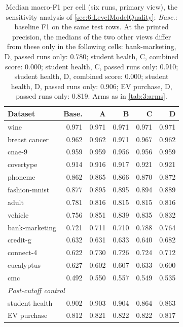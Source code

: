 \begin{table}[htbp]
  \centering
  \small
  \caption[Median F1 per cell]{Median macro-F1 per cell (six runs, primary view), the sensitivity analysis of \autoref{sec:6:LevelModelQuality}; \emph{Base.}: baseline F1 on the same test rows. At the printed precision, the medians of the two other views differ from these only in the following cells: bank-marketing, D, passed runs only: 0.780; student health, C, combined score: 0.000; student health, C, passed runs only: 0.910; student health, D, combined score: 0.000; student health, D, passed runs only: 0.906; EV purchase, D, passed runs only: 0.819. Arms as in \autoref{tab:3:arms}.}
  \label{tab:D:median}
  \begin{tabular}{lrrrrr}
    \toprule
    Dataset & Base. & A & B & C & D \\
    \midrule
    wine & 0.971 & 0.971 & 0.971 & 0.971 & 0.971 \\
    breast cancer & 0.962 & 0.962 & 0.971 & 0.967 & 0.962 \\
    cnae-9 & 0.959 & 0.959 & 0.956 & 0.956 & 0.959 \\
    covertype & 0.914 & 0.916 & 0.917 & 0.921 & 0.921 \\
    \addlinespace
    phoneme & 0.862 & 0.865 & 0.866 & 0.870 & 0.872 \\
    fashion-mnist & 0.877 & 0.895 & 0.895 & 0.894 & 0.889 \\
    adult & 0.781 & 0.816 & 0.815 & 0.815 & 0.816 \\
    vehicle & 0.756 & 0.851 & 0.839 & 0.835 & 0.832 \\
    \addlinespace
    bank-marketing & 0.721 & 0.711 & 0.710 & 0.788 & 0.764 \\
    credit-g & 0.632 & 0.631 & 0.633 & 0.640 & 0.682 \\
    connect-4 & 0.622 & 0.730 & 0.726 & 0.724 & 0.712 \\
    eucalyptus & 0.627 & 0.602 & 0.607 & 0.633 & 0.600 \\
    cmc & 0.492 & 0.550 & 0.557 & 0.549 & 0.535 \\
    \midrule
    \multicolumn{6}{l}{\emph{Post-cutoff control}} \\
    student health & 0.902 & 0.903 & 0.904 & 0.864 & 0.863 \\
    EV purchase & 0.812 & 0.821 & 0.822 & 0.822 & 0.817 \\
    \bottomrule
  \end{tabular}
\end{table}
